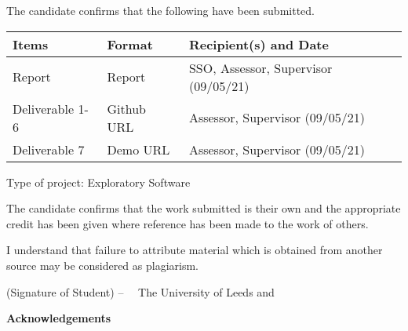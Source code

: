\frontcover

\clearpage
\noindent The candidate confirms that the following have been submitted.

\begin{center}
    \begin{tabular}{|l|l|l|}
        \hline 
        \bf{Items} & \bf{Format} & \bf{Recipient(s) and Date} \\ \hline
        Report & Report & SSO, Assessor, Supervisor (09/05/21) \\ \hline
        Deliverable 1-6 & Github URL & Assessor, Supervisor (09/05/21) \\ \hline 
        Deliverable 7 & Demo URL & Assessor, Supervisor (09/05/21) \\ \hline 
    \end{tabular} 
\end{center}

\noindent Type of project: Exploratory Software
\vspace{\fill}

\noindent The candidate confirms that the work submitted is their own and the appropriate credit has been given where reference has been made to the work of others.
\vspace{\fill}

\noindent I understand that failure to attribute material which is obtained from another source may be considered as plagiarism.

\vspace{\fill}
\flushright(Signature of Student) -- \fullname
\flushleft
\vspace{\fill}
\textcopyright~\session~The University of Leeds and~\fullname

\begin{dissertationsummary}

\end{dissertationsummary}

\clearpage
\centering\textbf{Acknowledgements}
\flushleft


\tableofcontents


